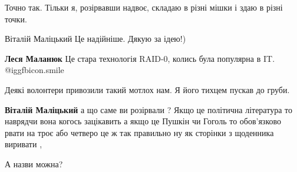 Точно так. Тільки я, розірвавши надвоє, складаю в різні мішки і здаю в різні
точки.

 
Віталій Маліцький Це надійніше. Дякую за ідею!)

 
\textbf{Леся Маланюк} Це стара технологія RAID-0, колись була популярна в IT.  @igg{fbicon.smile} 

 
Деякі волонтери привозили такий мотлох нам. Я його тихцем пускав до груби.

 
\textbf{Віталій Маліцький} а що саме ви розірвали ? Якщо це політична література то наврядчи вона когось зацікавить а якщо це Пушкін чи Гоголь то обов'язково рвати на троє або четверо це ж так правильно ну як сторінки з щоденника виривати ,

 
А назви можна?

 
